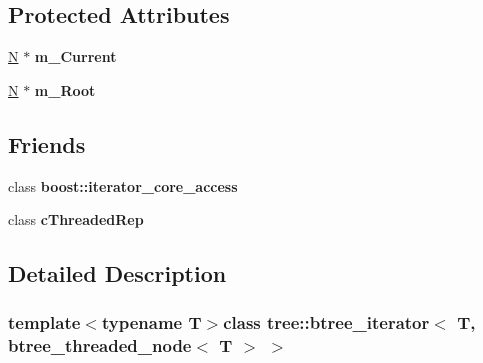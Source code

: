 \subsection*{\-Protected \-Attributes}
\begin{DoxyCompactItemize}
\item 
\hypertarget{classtree_1_1btree__iterator_3_01T_00_01btree__threaded__node_3_01T_01_4_01_4_a95443920e3a32b37c162c69cd41e6c96}{\hyperlink{structtree_1_1btree__threaded__node}{\-N} $\ast$ {\bfseries m\-\_\-\-Current}}\label{classtree_1_1btree__iterator_3_01T_00_01btree__threaded__node_3_01T_01_4_01_4_a95443920e3a32b37c162c69cd41e6c96}

\item 
\hypertarget{classtree_1_1btree__iterator_3_01T_00_01btree__threaded__node_3_01T_01_4_01_4_a8be171dbc88d3daf451dee7d7b969bf3}{\hyperlink{structtree_1_1btree__threaded__node}{\-N} $\ast$ {\bfseries m\-\_\-\-Root}}\label{classtree_1_1btree__iterator_3_01T_00_01btree__threaded__node_3_01T_01_4_01_4_a8be171dbc88d3daf451dee7d7b969bf3}

\end{DoxyCompactItemize}
\subsection*{\-Friends}
\begin{DoxyCompactItemize}
\item 
\hypertarget{classtree_1_1btree__iterator_3_01T_00_01btree__threaded__node_3_01T_01_4_01_4_ac09f73e325921cc50ebcd96bed0f8096}{class {\bfseries boost\-::iterator\-\_\-core\-\_\-access}}\label{classtree_1_1btree__iterator_3_01T_00_01btree__threaded__node_3_01T_01_4_01_4_ac09f73e325921cc50ebcd96bed0f8096}

\item 
\hypertarget{classtree_1_1btree__iterator_3_01T_00_01btree__threaded__node_3_01T_01_4_01_4_a973123b4003243e31913a996b7af1422}{class {\bfseries c\-Threaded\-Rep}}\label{classtree_1_1btree__iterator_3_01T_00_01btree__threaded__node_3_01T_01_4_01_4_a973123b4003243e31913a996b7af1422}

\end{DoxyCompactItemize}


\subsection{\-Detailed \-Description}
\subsubsection*{template$<$typename T$>$class tree\-::btree\-\_\-iterator$<$ T, btree\-\_\-threaded\-\_\-node$<$ T $>$ $>$}

